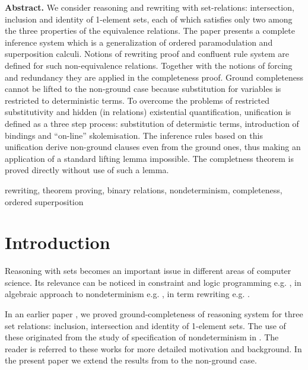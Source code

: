 \noindent
{\small
{\bf Abstract.}
We consider reasoning and rewriting with
set-relations: intersection, inclusion and identity of 1-element sets, each
of which satisfies only two among the three properties of the equivalence
relations.  The paper presents a complete inference system which is a
generalization of ordered paramodulation and superposition calculi.  Notions
of rewriting proof and confluent rule system are defined for such
non-equivalence relations. Together with the notions of forcing and redundancy
they are applied  in the completeness proof.  
Ground completeness cannot be lifted to the non-ground case
because substitution for variables is restricted to
deterministic terms.
To overcome the problems of restricted
substitutivity and hidden (in relations) existential quantification,
unification is defined as a three step process: substitution of determistic 
terms, introduction of bindings and ``on-line'' skolemisation.
The inference rules based on this unification derive non-ground clauses
even from the ground ones, thus making an application of a standard
lifting lemma impossible. The completness theorem is proved directly without 
use of such a lemma.

rewriting, theorem proving, binary relations, nondeterminism, 
completeness, ordered superposition
}%


\section{Introduction}

Reasoning with sets becomes an important issue in different areas of computer
science. Its relevance can be noticed in constraint and logic programming
e.g.  \cite {SD,DO,Jay}, in algebraic approach to nondeterminism e.g.
\cite {HusB,PS1,MW}, in term rewriting e.g. \cite {LA,Kap,HusB}.

In an earlier paper \cite{KW}, we proved ground-completeness of reasoning
system for three set relations:  inclusion, intersection  and
identity of 1-element sets. The use of these originated from the study
of specification of nondeterminism in \cite{Mich,MW-II,MW}. The reader is referred
to these works for more detailed motivation and background.
In the present paper we extend the results from \cite{KW} to the non-ground case.


